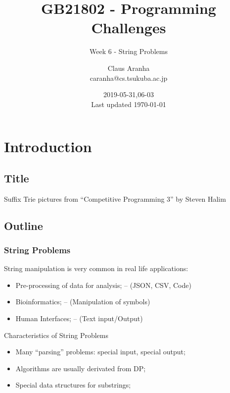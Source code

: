 \documentclass{beamer}
\title[GB21802]{GB21802 - Programming Challenges}
\subtitle[]{Week 6 - String Problems}
\author[Claus Aranha]{Claus Aranha\\{\footnotesize caranha@cs.tsukuba.ac.jp}}
\institute{College of Information Science}
\date{2019-05-31,06-03\\{\tiny Last updated \today}}
\begin{document}
\section{Introduction}
\subsection{Title}
\begin{frame}
\maketitle
\vfill

\hfill{\tiny Suffix Trie pictures from ``Competitive Programming 3'' by Steven Halim}
\end{frame}

% 

\subsection{Outline}

\begin{frame}
  \frametitle{String Problems}
    \begin{exampleblock}{}
      String manipulation is very common in real life applications:

      \begin{itemize}
      \item Pre-processing of data for analysis; -- (JSON, CSV, Code)
      \item Bioinformatics; -- (Manipulation of symbols)
      \item Human Interfaces; -- (Text input/Output)
      \end{itemize}
    \end{exampleblock}

    \begin{block}{Characteristics of String Problems}
      \begin{itemize}
      \item Many ``parsing'' problems: special input, special output;
      \item Algorithms are usually derivated from DP;
      \item Special data structures for substrings;
      \end{itemize}
    \end{block}

\end{frame}
\end{document}
